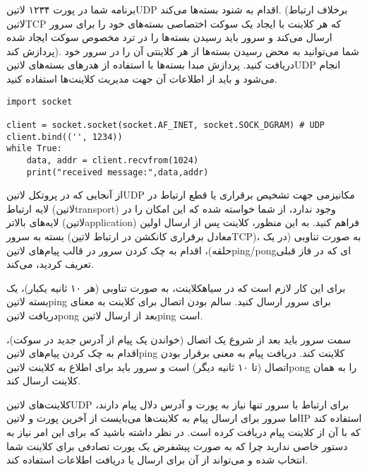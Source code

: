 \documentclass[]{article}
\begin{document}
  برنامه شما در پورت ۱۲۳۴ ‌لاتین{UDP} اقدام به شنود بسته‌ها می‌کند.
  (برخلاف ارتباط ‌لاتین{TCP} که هر کلاینت با ایجاد یک سوکت اختصاصی بسته‌های خود را برای سرور ارسال می‌کند و سرور باید رسیدن بسته‌ها را در ترد مخصوص سوکت ایجاد شده پردازش کند).
  شما می‌توانید به محض رسیدن بسته‌ها از هر کلاینتی آن را در سرور خود دریافت کنید.
  پردازش مبدا بسته‌ها با استفاده از هدرهای بسته‌های ‌لاتین{UDP} انجام می‌شود و باید از اطلاعات آن جهت مدیریت کلاینت‌ها استفاده کنید.

  \begin{latin}
  \begin{verbatim}
import socket

client = socket.socket(socket.AF_INET, socket.SOCK_DGRAM) # UDP
client.bind(('', 1234))
while True:
    data, addr = client.recvfrom(1024)
    print("received message:",data,addr)
  \end{verbatim}
  \end{latin}


  از آنجایی که در پروتکل ‌لاتین{UDP} مکانیزمی جهت تشخیص برقراری یا قطع ارتباط در لایه ارتباط (‌لاتین{transport}) وجود ندارد،
  از شما خواسته شده که این امکان را در لایه‌های بالاتر (‌لاتین{application}) فراهم کنید.
  به این منظور، کلاینت پس از ارسال اولین بسته به سرور (معادل برقراری کانکشن در ارتباط ‌لاتین{TCP})،
  به صورت تناوبی (در یک حلقه)، اقدام به چک کردن سرور در قالب پیام‌های ‌لاتین{ping/pong}ای که در فاز قبلی تعریف کردید، می‌کند.

  برای این کار لازم است که در ‌سیاه{کلاینت}، به صورت تناوبی (هر ۱۰ ثانیه یکبار)، یک بسته ‌لاتین{ping} برای سرور ارسال کنید.
  سالم بودن اتصال برای کلاینت به معنای دریافت ‌لاتین{pong} بعد از ارسال ‌لاتین{ping} است.

  سمت سرور باید بعد از شروع یک اتصال (خواندن یک پیام از آدرس جدید در سوکت)، اقدام به چک کردن پیام‌های ‌لاتین{ping} کلاینت کند.
  دریافت پیام به معنی برقرار بودن اتصال (تا ۱۰ ثانیه دیگر) است و سرور باید برای اطلاع به کلاینت ‌لاتین{pong} را به همان کلاینت ارسال کند.


  کلاینت‌های ‌لاتین{UDP} برای ارتباط با سرور تنها نیاز به پورت و آدرس دلال پیام دارند، اما سرور برای ارسال پیام به کلاینت‌ها
  می‌بایست از آخرین پورت و ‌لاتین{IP} استفاده کند که با آن از کلاینت پیام دریافت کرده است. در نظر داشته باشید که برای این امر
  نیاز به دستور خاصی ندارید چرا که به صورت پیشفرض یک پورت تصادفی برای کلاینت شما انتخاب شده و می‌تواند از آن برای ارسال
  یا دریافت اطلاعات استفاده کند.
\end{document}
